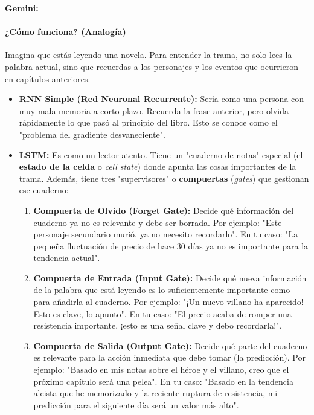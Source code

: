 \documentclass[12pt, a4paper]{article}
\newenvironment{gemini}{\par\noindent\textbf{Gemini:}\par\ignorespaces}{\par}
\begin{document}
\begin{gemini}
\paragraph{¿Cómo funciona? (Analogía)}
Imagina que estás leyendo una novela. Para entender la trama, no solo lees la palabra actual, sino que recuerdas a los personajes y los eventos que ocurrieron en capítulos anteriores.
\begin{itemize}
    \item \textbf{RNN Simple (Red Neuronal Recurrente):} Sería como una persona con muy mala memoria a corto plazo. Recuerda la frase anterior, pero olvida rápidamente lo que pasó al principio del libro. Esto se conoce como el "problema del gradiente desvaneciente".
    \item \textbf{LSTM:} Es como un lector atento. Tiene un "cuaderno de notas" especial (el \textbf{estado de la celda} o \textit{cell state}) donde apunta las cosas importantes de la trama. Además, tiene tres "supervisores" o \textbf{compuertas} (\textit{gates}) que gestionan ese cuaderno:
    \begin{enumerate}
        \item \textbf{Compuerta de Olvido (Forget Gate):} Decide qué información del cuaderno ya no es relevante y debe ser borrada. Por ejemplo: "Este personaje secundario murió, ya no necesito recordarlo". En tu caso: "La pequeña fluctuación de precio de hace 30 días ya no es importante para la tendencia actual".
        \item \textbf{Compuerta de Entrada (Input Gate):} Decide qué nueva información de la palabra que está leyendo es lo suficientemente importante como para añadirla al cuaderno. Por ejemplo: "¡Un nuevo villano ha aparecido! Esto es clave, lo apunto". En tu caso: "El precio acaba de romper una resistencia importante, ¡esto es una señal clave y debo recordarla!".
        \item \textbf{Compuerta de Salida (Output Gate):} Decide qué parte del cuaderno es relevante para la acción inmediata que debe tomar (la predicción). Por ejemplo: "Basado en mis notas sobre el héroe y el villano, creo que el próximo capítulo será una pelea". En tu caso: "Basado en la tendencia alcista que he memorizado y la reciente ruptura de resistencia, mi predicción para el siguiente día será un valor más alto".
    \end{enumerate}
\end{itemize}


\end{gemini}
\end{document}
